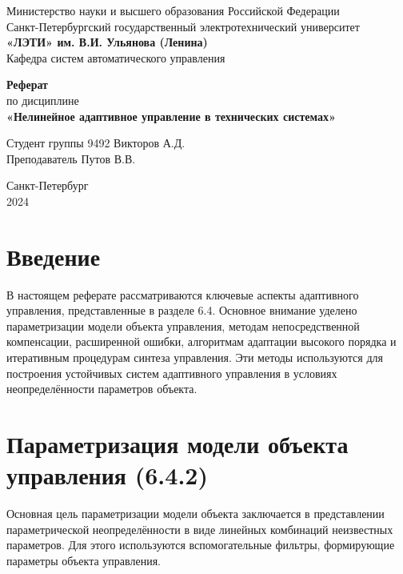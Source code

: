 \documentclass[a4paper,14pt]{extarticle} %
\begin{document}
\begin{titlepage}
    \begin{center}
        \large
        Министерство науки и высшего образования Российской Федерации \\
        Санкт-Петербургский государственный электротехнический университет \\
        \textbf{«ЛЭТИ» им. В.И. Ульянова (Ленина)} \\
        Кафедра систем автоматического управления

        \vfill

        \textbf{Реферат} \\
        по дисциплине \\
        \textbf{«Нелинейное адаптивное управление в технических системах»}

        \vfill

        Студент группы 9492 \hfill Викторов А.Д. \\
        Преподаватель \hfill Путов В.В.

        \vfill
        Санкт-Петербург \\
        2024
    \end{center}
\end{titlepage}

\setcounter{page}{2}
\tableofcontents

\newpage
\section*{Введение}
В настоящем реферате рассматриваются ключевые аспекты адаптивного управления, представленные в разделе 6.4. Основное внимание уделено параметризации модели объекта управления, методам непосредственной компенсации, расширенной ошибки, алгоритмам адаптации высокого порядка и итеративным процедурам синтеза управления. Эти методы используются для построения устойчивых систем адаптивного управления в условиях неопределённости параметров объекта.

\section{Параметризация модели объекта управления (6.4.2)}

Основная цель параметризации модели объекта заключается в представлении параметрической неопределённости в виде линейных комбинаций неизвестных параметров. Для этого используются вспомогательные фильтры, формирующие параметры объекта управления. 
\end{document}
